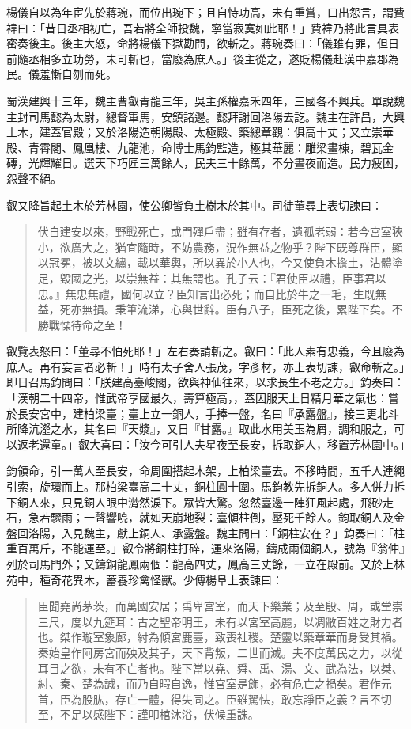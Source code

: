 楊儀自以為年宦先於蔣琬，而位出琬下；且自恃功高，未有重賞，口出怨言，謂費褘曰：「昔日丞相初亡，吾若將全師投魏，寧當寂寞如此耶！」費褘乃將此言具表密奏後主。後主大怒，命將楊儀下獄勘問，欲斬之。蔣琬奏曰：「儀雖有罪，但日前隨丞相多立功勞，未可斬也，當廢為庶人。」後主從之，遂貶楊儀赴漢中嘉郡為民。儀羞慚自刎而死。

蜀漢建興十三年，魏主曹叡青龍三年，吳主孫權嘉禾四年，三國各不興兵。單說魏主封司馬懿為太尉，總督軍馬，安鎮諸邊。懿拜謝回洛陽去訖。魏主在許昌，大興土木，建蓋官殿；又於洛陽造朝陽殿、太極殿、築總章觀：俱高十丈；又立崇華殿、青霄閣、鳳凰樓、九龍池，命博士馬鈞監造，極其華麗：雕梁畫棟，碧瓦金磚，光輝耀日。選天下巧匠三萬餘人，民夫三十餘萬，不分晝夜而造。民力疲困，怨聲不絕。

叡又降旨起土木於芳林園，使公卿皆負土樹木於其中。司徒董尋上表切諫曰：

\begin{quote}
伏自建安以來，野戰死亡，或門殫戶盡；雖有存者，遺孤老弱：若今宮室狹小，欲廣大之，猶宜隨時，不妨農務，況作無益之物乎？陛下既尊群臣，顯以冠冕，被以文繡，載以華輿，所以異於小人也，今又使負木擔土，沾體塗足，毀國之光，以崇無益：其無謂也。孔子云：『君使臣以禮，臣事君以忠。』無忠無禮，國何以立？臣知言出必死；而自比於牛之一毛，生既無益，死亦無損。秉筆流涕，心與世辭。臣有八子，臣死之後，累陛下矣。不勝戰慄待命之至！
\end{quote}

叡覽表怒曰：「董尋不怕死耶！」左右奏請斬之。叡曰：「此人素有忠義，今且廢為庶人。再有妄言者必斬！」時有太子舍人張茂，字彥材，亦上表切諫，叡命斬之。」即日召馬鈞問曰：「朕建高臺峻閣，欲與神仙往來，以求長生不老之方。」鈞奏曰：「漢朝二十四帝，惟武帝享國最久，壽算極高，，蓋因服天上日精月華之氣也：嘗於長安宮中，建柏梁臺；臺上立一銅人，手捧一盤，名曰『承露盤』，接三更北斗所降沆瀣之水，其名曰『天漿』，又日『甘露。』取此水用美玉為屑，調和服之，可以返老還童。」叡大喜曰：「汝今可引人夫星夜至長安，拆取銅人，移置芳林園中。」

鈞領命，引一萬人至長安，命周圍搭起木架，上柏梁臺去。不移時間，五千人連繩引索，旋環而上。那柏梁臺高二十丈，銅柱圓十圍。馬鈞教先拆銅人。多人併力拆下銅人來，只見銅人眼中潸然淚下。眾皆大驚。忽然臺邊一陣狂風起處，飛砂走石，急若驟雨；一聲響喨，就如天崩地裂：臺傾柱倒，壓死千餘人。鈞取銅人及金盤回洛陽，入見魏主，獻上銅人、承露盤。魏主問曰：「銅柱安在？」鈞奏曰：「柱重百萬斤，不能運至。」叡令將銅柱打碎，運來洛陽，鑄成兩個銅人，號為『翁仲』列於司馬門外；又鑄銅龍鳳兩個：龍高四丈，鳳高三丈餘，一立在殿前。又於上林苑中，種奇花異木，蓄養珍禽怪獸。少傅楊阜上表諫曰：

\begin{quote}
臣聞堯尚茅茨，而萬國安居；禹卑宮室，而天下樂業；及至殷、周，或堂崇三尺，度以九筵耳：古之聖帝明王，未有以宮室高麗，以凋敝百姓之財力者也。桀作璇室象廊，紂為傾宮鹿臺，致喪社稷。楚靈以築章華而身受其禍。秦始皇作阿房宮而殃及其子，天下背叛，二世而滅。夫不度萬民之力，以從耳目之欲，未有不亡者也。陛下當以堯、舜、禹、湯、文、武為法，以桀、紂、秦、楚為誠，而乃自暇自逸，惟宮室是飾，必有危亡之禍矣。君作元首，臣為股肱，存亡一體，得失同之。臣雖駑怯，敢忘諍臣之義？言不切至，不足以感陛下：謹叩棺沐浴，伏候重誅。
\end{quote}

